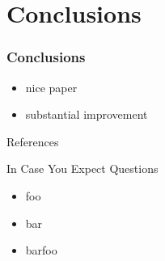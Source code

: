 \documentclass[presentation,professionalfonts]{beamer}
\begin{document}
\section{Conclusions}

\begin{frame}
  \frametitle{Conclusions}
  \begin{itemize}
  \item nice paper 
  \item substantial improvement
  \end{itemize}  
\end{frame}


\begin{frame}[fragile]{References}
\printbibliography
\end{frame}

\appendix

\begin{frame}{In Case You Expect Questions}
\centering
\begin{itemize}
\item foo
\item bar
\item barfoo
\end{itemize}
\end{frame}
\end{document}
